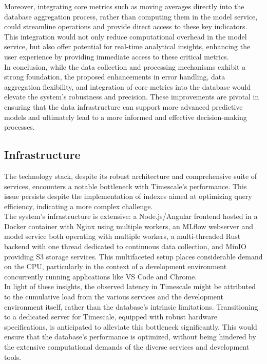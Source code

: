 Moreover, integrating core metrics such as moving averages directly into the database aggregation process, rather than computing them in the model service, could streamline operations and provide direct access to these key indicators. This integration would not only reduce computational overhead in the model service, but also offer potential for real-time analytical insights, enhancing the user experience by providing immediate access to these critical metrics. \\

In conclusion, while the data collection and processing mechanisms exhibit a strong foundation, the proposed enhancements in error handling, data aggregation flexibility, and integration of core metrics into the database would elevate the system's robustness and precision. These improvements are pivotal in ensuring that the data infrastructure can support more advanced predictive models and ultimately lead to a more informed and effective decision-making processes. \\

\subsection{Infrastructure}
The technology stack, despite its robust architecture and comprehensive suite of services, encounters a notable bottleneck with Timescale's performance. This issue persists despite the implementation of indexes aimed at optimizing query efficiency, indicating a more complex challenge. \\

The system's infrastructure is extensive: a Node.js/Angular frontend hosted in a Docker container with Nginx using multiple workers, an MLflow webserver and model service both operating with multiple workers, a multi-threaded Rust backend with one thread dedicated to continuous data collection, and MinIO providing S3 storage services. This multifaceted setup places considerable demand on the CPU, particularly in the context of a development environment concurrently running applications like VS Code and Chrome. \\

In light of these insights, the observed latency in Timescale might be attributed to the cumulative load from the various services and the development environment itself, rather than the database's intrinsic limitations. Transitioning to a dedicated server for Timescale, equipped with robust hardware specifications, is anticipated to alleviate this bottleneck significantly. This would ensure that the database's performance is optimized, without being hindered by the extensive computational demands of the diverse services and development tools. \\

